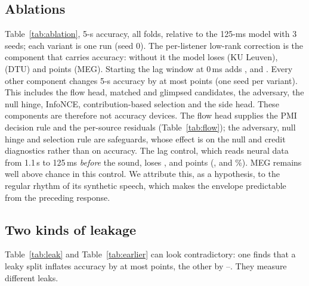 \documentclass[twoside]{article}
\begin{document}
\subsection{Ablations}\label{app:ablation}
Table~\ref{tab:ablation}, 5-s accuracy, all folds, relative to the
125-ms model with 3 seeds; each variant is one run (seed 0). The per-listener low-rank correction is the component that
carries accuracy: without it the model loses \ablRankKUL{} (KU Leuven), \ablRankDTU{} (DTU) and
\ablRankMEG{} points (MEG). Starting the lag window at 0\,ms adds \lagZeroKUL, \lagZeroDTU{}
and \lagZeroMEG. Every other component changes 5-s accuracy by at most \ablOtherMax{} points
(one seed per variant). This includes the flow head, matched and glimpsed candidates,
the adversary, the null hinge, InfoNCE, contribution-based selection and the side head. These
components are therefore not accuracy devices. The flow head supplies the PMI decision rule
and the per-source residuals (Table~\ref{tab:flow}); the adversary, null hinge and selection
rule are safeguards, whose effect is on the null and credit diagnostics rather than on
accuracy. The lag control, which reads neural data from 1.1\,s to 125\,ms \emph{before} the
sound, loses \lagCtlKUL, \lagCtlDTU{} and \lagCtlMEG{} points (\lagCtlAccKUL, \lagCtlAccDTU{} and
\lagCtlAccMEG\%). MEG remains well above chance in this control. We attribute this, as a
hypothesis, to the regular rhythm of its synthetic speech, which makes the envelope
predictable from the preceding response.
\begin{table}[h]\centering\small
\caption{Change in 5-s accuracy (points) when one component is removed; full model:
mean$\pm$s.d.\ over 3 seeds, 125-ms lag window; variants: seed 0.}\label{tab:ablation}

\end{table}

\FloatBarrier
\subsection{Two kinds of leakage}\label{app:leak}
Table~\ref{tab:leak} and Table~\ref{tab:earlier} can look contradictory: one finds that a
leaky split inflates accuracy by at most \leakMax{} points, the other by
\oldDropAllMin--\oldDropAllMax. They measure different leaks.
\end{document}
